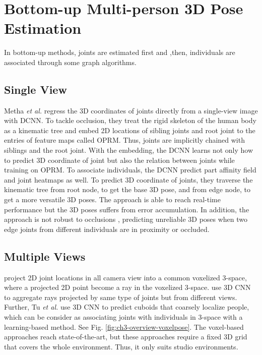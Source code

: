 \section{Bottom-up Multi-person 3D Pose Estimation}
In bottom-up methods, joints are estimated first and ,then, individuals are associated through some graph algorithms.
\subsection{Single View}
Metha \textit{et al.} \cite{singleshotmultiperson2018} regress the 3D coordinates of joints directly from a single-view image with DCNN. To tackle occlusion, they treat the rigid skeleton of the human body as a kinematic tree and embed 2D locations of sibling joints and root joint to the entries of feature maps called OPRM. Thus, joints are implicitly chained with siblings and the root joint. With the embedding, the DCNN learns not only how to predict 3D coordinate of joint but also the relation between joints while training on OPRM. To associate individuals, the DCNN predict part affinity field and joint heatmaps as well. To predict 3D coordinate of joints, they traverse the kinematic tree from root node, to get the base 3D pose, and from edge node, to get a more versatile 3D poses. The approach is able to reach real-time performance but the 3D poses suffers from error accumulation. In addition, the approach is not robust to occlusions , predicting unreliable 3D poses when two edge joints from different individuals are in proximity or occluded. 
\subsection{Multiple Views}
\cite{iskakov2019learnable, voxelpose} project 2D joint locations in all camera view into a common voxelized 3-space, where a projected 2D point become a ray in the voxelized 3-space. \cite{iskakov2019learnable, voxelpose} use 3D CNN to aggregate rays projected by same type of joints but from different views. Further, Tu \textit{et al.} \cite{voxelpose} use 3D CNN to predict cuboids that coarsely localize people, which can be consider as associating joints with individuals in 3-space with a learning-based method. See Fig. \ref{fig:ch3-overview-voxelpose}. The voxel-based approaches reach state-of-the-art, but these approaches require a fixed 3D grid that covers the whole environment. Thus, it only suits studio environments.

